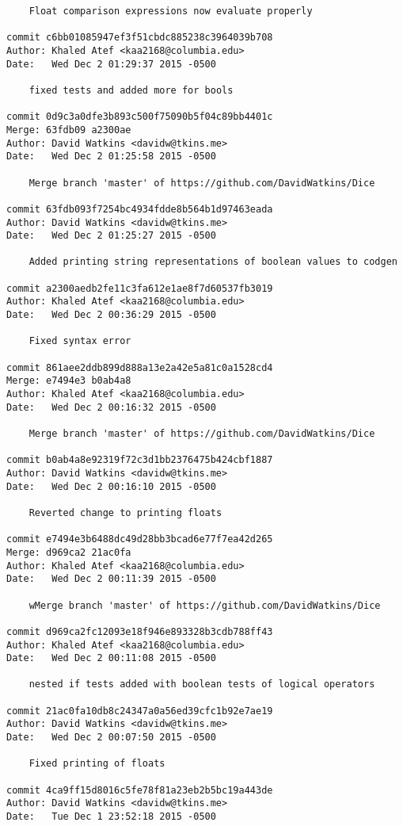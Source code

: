 \begin{verbatim}
    Float comparison expressions now evaluate properly

commit c6bb01085947ef3f51cbdc885238c3964039b708
Author: Khaled Atef <kaa2168@columbia.edu>
Date:   Wed Dec 2 01:29:37 2015 -0500

    fixed tests and added more for bools

commit 0d9c3a0dfe3b893c500f75090b5f04c89bb4401c
Merge: 63fdb09 a2300ae
Author: David Watkins <davidw@tkins.me>
Date:   Wed Dec 2 01:25:58 2015 -0500

    Merge branch 'master' of https://github.com/DavidWatkins/Dice

commit 63fdb093f7254bc4934fdde8b564b1d97463eada
Author: David Watkins <davidw@tkins.me>
Date:   Wed Dec 2 01:25:27 2015 -0500

    Added printing string representations of boolean values to codgen

commit a2300aedb2fe11c3fa612e1ae8f7d60537fb3019
Author: Khaled Atef <kaa2168@columbia.edu>
Date:   Wed Dec 2 00:36:29 2015 -0500

    Fixed syntax error

commit 861aee2ddb899d888a13e2a42e5a81c0a1528cd4
Merge: e7494e3 b0ab4a8
Author: Khaled Atef <kaa2168@columbia.edu>
Date:   Wed Dec 2 00:16:32 2015 -0500

    Merge branch 'master' of https://github.com/DavidWatkins/Dice

commit b0ab4a8e92319f72c3d1bb2376475b424cbf1887
Author: David Watkins <davidw@tkins.me>
Date:   Wed Dec 2 00:16:10 2015 -0500

    Reverted change to printing floats

commit e7494e3b6488dc49d28bb3bcad6e77f7ea42d265
Merge: d969ca2 21ac0fa
Author: Khaled Atef <kaa2168@columbia.edu>
Date:   Wed Dec 2 00:11:39 2015 -0500

    wMerge branch 'master' of https://github.com/DavidWatkins/Dice

commit d969ca2fc12093e18f946e893328b3cdb788ff43
Author: Khaled Atef <kaa2168@columbia.edu>
Date:   Wed Dec 2 00:11:08 2015 -0500

    nested if tests added with boolean tests of logical operators

commit 21ac0fa10db8c24347a0a56ed39cfc1b92e7ae19
Author: David Watkins <davidw@tkins.me>
Date:   Wed Dec 2 00:07:50 2015 -0500

    Fixed printing of floats

commit 4ca9ff15d8016c5fe78f81a23eb2b5bc19a443de
Author: David Watkins <davidw@tkins.me>
Date:   Tue Dec 1 23:52:18 2015 -0500


\end{verbatim}

